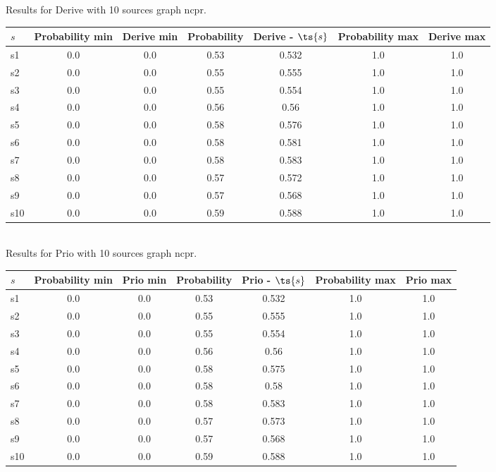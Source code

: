 \documentclass{article}
\begin{document}
\noindent Results for Derive with 10 sources graph ncpr.

\noindent\begin{tabular}{|l|c|c|c|c|c|c|}
\hline
$s$& Probability min & Derive min & Probability & Derive - $\ts{s}$ & Probability max & Derive max\\
\hline
s1 &0.0 & 0.0 & 0.53 & 0.532 & 1.0 & 1.0\\
\hline
s2 &0.0 & 0.0 & 0.55 & 0.555 & 1.0 & 1.0\\
\hline
s3 &0.0 & 0.0 & 0.55 & 0.554 & 1.0 & 1.0\\
\hline
s4 &0.0 & 0.0 & 0.56 & 0.56 & 1.0 & 1.0\\
\hline
s5 &0.0 & 0.0 & 0.58 & 0.576 & 1.0 & 1.0\\
\hline
s6 &0.0 & 0.0 & 0.58 & 0.581 & 1.0 & 1.0\\
\hline
s7 &0.0 & 0.0 & 0.58 & 0.583 & 1.0 & 1.0\\
\hline
s8 &0.0 & 0.0 & 0.57 & 0.572 & 1.0 & 1.0\\
\hline
s9 &0.0 & 0.0 & 0.57 & 0.568 & 1.0 & 1.0\\
\hline
s10 &0.0 & 0.0 & 0.59 & 0.588 & 1.0 & 1.0\\
\hline
\end{tabular}\\

\noindent Results for Prio with 10 sources graph ncpr.

\noindent\begin{tabular}{|l|c|c|c|c|c|c|}
\hline
$s$& Probability min & Prio min & Probability & Prio - $\ts{s}$ & Probability max & Prio max\\
\hline
s1 &0.0 & 0.0 & 0.53 & 0.532 & 1.0 & 1.0\\
\hline
s2 &0.0 & 0.0 & 0.55 & 0.555 & 1.0 & 1.0\\
\hline
s3 &0.0 & 0.0 & 0.55 & 0.554 & 1.0 & 1.0\\
\hline
s4 &0.0 & 0.0 & 0.56 & 0.56 & 1.0 & 1.0\\
\hline
s5 &0.0 & 0.0 & 0.58 & 0.575 & 1.0 & 1.0\\
\hline
s6 &0.0 & 0.0 & 0.58 & 0.58 & 1.0 & 1.0\\
\hline
s7 &0.0 & 0.0 & 0.58 & 0.583 & 1.0 & 1.0\\
\hline
s8 &0.0 & 0.0 & 0.57 & 0.573 & 1.0 & 1.0\\
\hline
s9 &0.0 & 0.0 & 0.57 & 0.568 & 1.0 & 1.0\\
\hline
s10 &0.0 & 0.0 & 0.59 & 0.588 & 1.0 & 1.0\\
\hline
\end{tabular}\\
\end{document}
